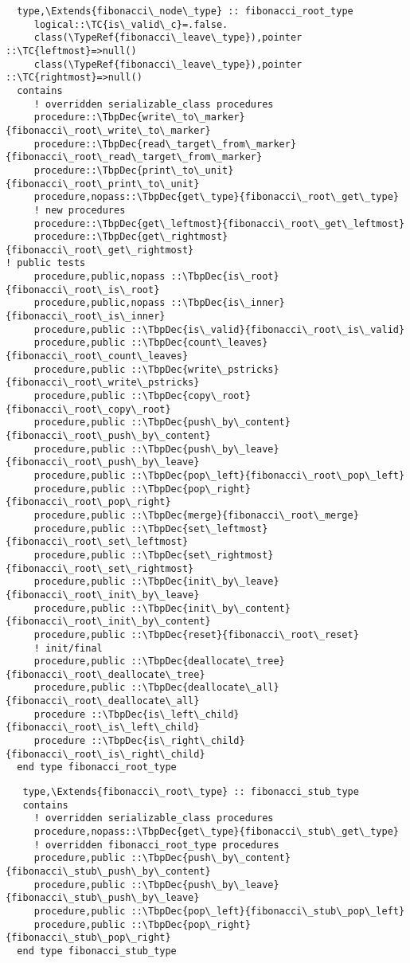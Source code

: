 \begin{Verbatim}
  type,\Extends{fibonacci\_node\_type} :: fibonacci_root_type
     logical::\TC{is\_valid\_c}=.false.
     class(\TypeRef{fibonacci\_leave\_type}),pointer ::\TC{leftmost}=>null()
     class(\TypeRef{fibonacci\_leave\_type}),pointer ::\TC{rightmost}=>null()
  contains
     ! overridden serializable_class procedures
     procedure::\TbpDec{write\_to\_marker}{fibonacci\_root\_write\_to\_marker}
     procedure::\TbpDec{read\_target\_from\_marker}{fibonacci\_root\_read\_target\_from\_marker}
     procedure::\TbpDec{print\_to\_unit}{fibonacci\_root\_print\_to\_unit}
     procedure,nopass::\TbpDec{get\_type}{fibonacci\_root\_get\_type}
     ! new procedures
     procedure::\TbpDec{get\_leftmost}{fibonacci\_root\_get\_leftmost}
     procedure::\TbpDec{get\_rightmost}{fibonacci\_root\_get\_rightmost}
! public tests
     procedure,public,nopass ::\TbpDec{is\_root}{fibonacci\_root\_is\_root}
     procedure,public,nopass ::\TbpDec{is\_inner}{fibonacci\_root\_is\_inner}
     procedure,public ::\TbpDec{is\_valid}{fibonacci\_root\_is\_valid}
     procedure,public ::\TbpDec{count\_leaves}{fibonacci\_root\_count\_leaves}
     procedure,public ::\TbpDec{write\_pstricks}{fibonacci\_root\_write\_pstricks}
     procedure,public ::\TbpDec{copy\_root}{fibonacci\_root\_copy\_root}
     procedure,public ::\TbpDec{push\_by\_content}{fibonacci\_root\_push\_by\_content}
     procedure,public ::\TbpDec{push\_by\_leave}{fibonacci\_root\_push\_by\_leave}
     procedure,public ::\TbpDec{pop\_left}{fibonacci\_root\_pop\_left}
     procedure,public ::\TbpDec{pop\_right}{fibonacci\_root\_pop\_right}
     procedure,public ::\TbpDec{merge}{fibonacci\_root\_merge}
     procedure,public ::\TbpDec{set\_leftmost}{fibonacci\_root\_set\_leftmost}
     procedure,public ::\TbpDec{set\_rightmost}{fibonacci\_root\_set\_rightmost}
     procedure,public ::\TbpDec{init\_by\_leave}{fibonacci\_root\_init\_by\_leave}
     procedure,public ::\TbpDec{init\_by\_content}{fibonacci\_root\_init\_by\_content}
     procedure,public ::\TbpDec{reset}{fibonacci\_root\_reset}
     ! init/final
     procedure,public ::\TbpDec{deallocate\_tree}{fibonacci\_root\_deallocate\_tree}
     procedure,public ::\TbpDec{deallocate\_all}{fibonacci\_root\_deallocate\_all}
     procedure ::\TbpDec{is\_left\_child}{fibonacci\_root\_is\_left\_child}
     procedure ::\TbpDec{is\_right\_child}{fibonacci\_root\_is\_right\_child}
  end type fibonacci_root_type
\end{Verbatim}
\begin{Verbatim}
   type,\Extends{fibonacci\_root\_type} :: fibonacci_stub_type
   contains
     ! overridden serializable_class procedures
     procedure,nopass::\TbpDec{get\_type}{fibonacci\_stub\_get\_type}
     ! overridden fibonacci_root_type procedures
     procedure,public ::\TbpDec{push\_by\_content}{fibonacci\_stub\_push\_by\_content}
     procedure,public ::\TbpDec{push\_by\_leave}{fibonacci\_stub\_push\_by\_leave}
     procedure,public ::\TbpDec{pop\_left}{fibonacci\_stub\_pop\_left}
     procedure,public ::\TbpDec{pop\_right}{fibonacci\_stub\_pop\_right}
  end type fibonacci_stub_type
\end{Verbatim}
